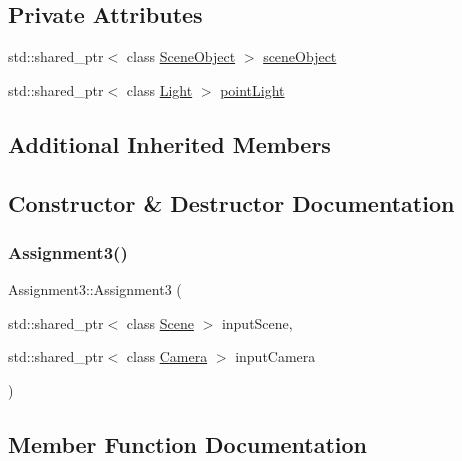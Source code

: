 \subsection*{Private Attributes}
\begin{DoxyCompactItemize}
\item 
std\+::shared\+\_\+ptr$<$ class \hyperlink{class_scene_object}{Scene\+Object} $>$ \hyperlink{class_assignment3_a0bc175d3efff30c5f4aa3ffa1272338a}{scene\+Object}
\item 
std\+::shared\+\_\+ptr$<$ class \hyperlink{class_light}{Light} $>$ \hyperlink{class_assignment3_ad1cf5a76d62b5a1ed17e66c31e0feb98}{point\+Light}
\end{DoxyCompactItemize}
\subsection*{Additional Inherited Members}


\subsection{Constructor \& Destructor Documentation}
\hypertarget{class_assignment3_adb8e9ac0681c600affc3370f5e5422b2}{}\label{class_assignment3_adb8e9ac0681c600affc3370f5e5422b2} 
\subsubsection{\texorpdfstring{Assignment3()}{Assignment3()}}
{\footnotesize\ttfamily Assignment3\+::\+Assignment3 (\begin{DoxyParamCaption}\item[{std\+::shared\+\_\+ptr$<$ class \hyperlink{class_scene}{Scene} $>$}]{input\+Scene,  }\item[{std\+::shared\+\_\+ptr$<$ class \hyperlink{class_camera}{Camera} $>$}]{input\+Camera }\end{DoxyParamCaption})}



\subsection{Member Function Documentation}
\hypertarget{class_assignment3_a12b30bd7b8a0bcefbd977f126ce00b25}{}\label{class_assignment3_a12b30bd7b8a0bcefbd977f126ce00b25} 
